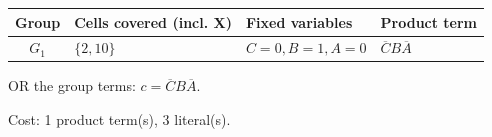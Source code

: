 \documentclass[a4paper,11pt]{article}
\begin{document}
\begin{minipage}{\textwidth}
\begin{center}\small
\begin{tabular}{clll}
\toprule
Group & Cells covered (incl. X) & Fixed variables & Product term\\\midrule
\textcolor{blue!75!black}{$G_{1}$} & $\{2,10\}$ & $C=0,B=1,A=0$ & $\overline{C}B\overline{A}$\\
\bottomrule\end{tabular}\end{center}


\noindent OR the group terms: $\boxed{c=\overline{C}B\overline{A}}$.

\noindent Cost: 1 product term(s), 3 literal(s).

\end{minipage}\par\vspace{0.25cm}
\end{document}
